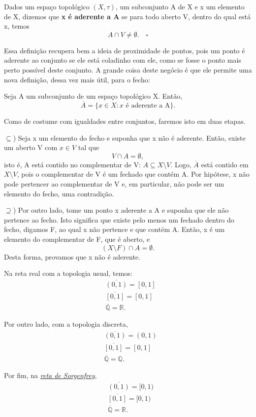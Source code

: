\documentclass[../topology_notes.tex]{subfiles}
\begin{document}
\begin{def*}
	Dados um espaço topológico \((X, \tau )\), um subconjunto A de X e x um elemento de X, dizemos que \textbf{x é aderente a A} se para todo aberto V, dentro do qual está x, temos
	\[
		A\cap V \neq\emptyset.\quad \square
	\]
\end{def*}
Essa definição recupera bem a ideia de proximidade de pontos, pois um ponto é aderente ao conjunto se ele está coladinho com ele, como se fosse o ponto mais perto possível deste conjunto. A grande coisa deste negócio é que ele permite uma nova definição, dessa vez mais útil, para o fecho:
\begin{prop*}
	Seja A um subconjunto de um espaço topológico X. Então,
	\[
		\overline{A} = \{x\in X: x \text{ é aderente a A}\}.
	\]
\end{prop*}
\begin{proof*}
	Como de costume com igualdades entre conjuntos, faremos isto em duas etapas.

	\(\subseteq \)) Seja x um elemento do fecho e suponha que x não é aderente. Então, existe um aberto V com \(x\in V\) tal que
	\[
		V\cap A = \emptyset,
	\]
	isto é, A está contido no complementar de V: \(A\subseteq X\setminus{V}\). Logo, \(\overline{A}\) está contido em \(X\setminus{V}\), pois o complementar de V é um fechado que contém A. Por hipótese, x não pode
	pertencer ao complementar de V e, em particular, não pode ser um elemento do fecho, uma contradição.

	\(\supseteq \)) Por outro lado, tome um ponto x aderente a A e suponha que ele não pertence ao fecho. Isto significa que existe pelo menos um fechado dentro do fecho, digamos F, ao qual x não pertence e que contém A.
	Então, x é um elemento do complementar de F, que é aberto, e
	\[
		(X\setminus{F})\cap A = \emptyset .
	\]
	Desta forma, provamos que x não é aderente. \qedsymbol
\end{proof*}
\begin{example}
	Na reta real com a topologia usual, temos:
	\begin{align*}
		 & \overline{(0, 1)} = [0, 1]          \\
		 & \overline{[0, 1]} = [0, 1]          \\
		 & \overline{\mathbb{Q}} = \mathbb{R}.
	\end{align*}

	Por outro lado, com a topologia discreta,
	\begin{align*}
		 & \overline{(0, 1)} = (0, 1)          \\
		 & \overline{[0, 1]} = [0, 1]          \\
		 & \overline{\mathbb{Q}} = \mathbb{Q}.
	\end{align*}

	Por fim, na \hyperlink{sorgenfrey}{\textit{reta de Sorgenfrey}},
	\begin{align*}
		 & \overline{(0, 1)} = [0, 1)          \\
		 & \overline{[0, 1]} = [0, 1)          \\
		 & \overline{\mathbb{Q}} = \mathbb{R}.
	\end{align*}
\end{example}
\end{document}
